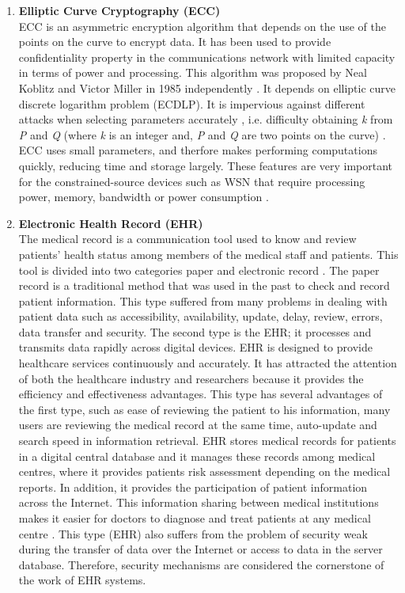\documentclass[a4paper,11pt]{article}
\begin{document}
\begin{enumerate} 
\item \textbf{Elliptic Curve Cryptography (ECC)}\\
ECC is an asymmetric encryption algorithm that depends on the use of the points on the curve to encrypt data. It has been used to provide confidentiality property in the communications network with limited capacity in terms of power and processing. This algorithm was proposed by Neal Koblitz and Victor Miller in 1985 independently \cite{p14}. It depends on elliptic curve discrete logarithm problem (ECDLP). It is impervious against different attacks when selecting parameters accurately \cite{p18}, i.e. difficulty obtaining \textit{k} from \textit{P} and \textit{Q} (where \textit{k} is an integer and, \textit{P} and \textit{Q} are two points on the curve) \cite{p19}. ECC uses small parameters, and therfore makes performing computations quickly, reducing time and storage largely. These features are very important for the constrained-source devices such as WSN that require processing power, memory, bandwidth or power consumption \cite{p5}.

\item \textbf{Electronic Health Record (EHR)}\\
The medical record is a communication tool used to know and review patients' health status among members of the medical staff and patients. This tool is divided into two categories paper and electronic record \cite{pr40}. The paper record is a traditional method that was used in the past to check and record patient information. This type suffered from many problems in dealing with patient data such as accessibility, availability, update, delay, review, errors, data transfer and security. The second type is the EHR; it processes and transmits data rapidly across digital devices. EHR is designed to provide healthcare services continuously and accurately. It has attracted the attention of both the healthcare industry and researchers because it provides the efficiency and effectiveness advantages. This type has several advantages of the first type, such as ease of reviewing the patient to his information, many users are reviewing the medical record at the same time, auto-update and search speed in information retrieval. EHR stores medical records for patients in a digital central database and it manages these records among medical centres, where it provides patients risk assessment depending on the medical reports. In addition, it provides the participation of patient information across the Internet. This information sharing between medical institutions makes it easier for doctors to diagnose and treat patients at any medical centre \cite{pr39}. This type (EHR) also suffers from the problem of security weak during the transfer of data over the Internet or access to data in the server database. Therefore, security mechanisms are considered the cornerstone of the work of EHR systems.


\end{enumerate}
\end{document}
